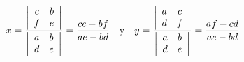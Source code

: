 \documentclass[12pt]{report}
\theoremstyle{largebreak}
\newcommand\abs[1]{\ensuremath{\left|#1\right|}}
\begin{document}
    \begin{equation*}
        x=\frac{\abs{\begin{array}{cc}
            c & b \\
            f & e \\
        \end{array}}}{\abs{\begin{array}{cc}
            a & b \\
            d & e \\
        \end{array}}}=\frac{ce-bf}{ae-bd}\quad\textup{y}\quad y=\frac{\abs{\begin{array}{cc}
            a & c \\
            d & f \\
        \end{array}}}{\abs{\begin{array}{cc}
            a & b \\
            d & e \\
        \end{array}}}=\frac{af-cd}{ae-bd}
    \end{equation*}
\end{document}
